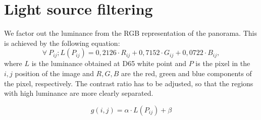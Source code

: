 \section{Light source filtering}\label{lsf}
We factor out the luminance from the RGB representation of the panorama. This is achieved by the following equation:
\begin{equation}
  \forall \  P_{ij}; L(P_{ij}) = 0,2126 \cdot R_{ij} + 0,7152 \cdot G_{ij} + 0,0722 \cdot B_{ij} ,
\end{equation}
where $L$ is the luminance obtained at D65 white point and $P$ is the pixel in the $i,j$ position of the image and $R,G,B$ are the red, green and blue components of the pixel, respectively. \newline
The contrast ratio has to be adjusted, so that the regions with high luminance are more clearly separated.

\begin{equation}
     g(i,j) = \alpha \cdot L(P_{ij}) + \beta
\end{equation}


